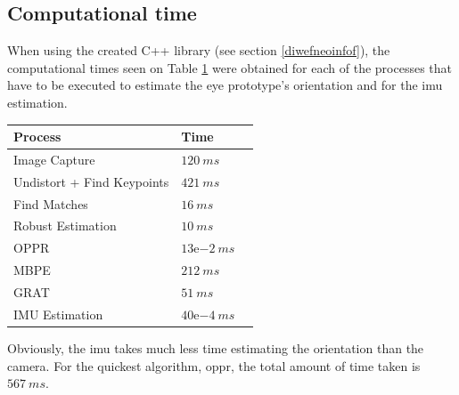 \subsection{Computational time}

When using the created C++ library (see section \ref{diwefneoinfof}), the computational times seen on Table \ref{cha5:sec1:speed} were obtained for each of the processes that have to be executed to estimate the eye prototype's orientation and for the \acrshort{imu} estimation.

\begin{table}[ht]
	\centering
	\begin{tabular}{| l | l | l |}
		\hline
		Process & Time \\
		\hline
		Image Capture & $120 \ ms$  \\
		\hline
		Undistort + Find Keypoints &   $421 \ ms$ \\
		\hline
		Find Matches & $16 \ ms$ \\ 
		\hline
		Robust Estimation & $10 \ ms$ \\ 
		\hline
		OPPR & $13\mathrm{e}{-2} \ ms$ \\ 
		\hline
		MBPE & $212 \ ms$ \\ 
		\hline
		GRAT & $51 \ ms$ \\ 
		\hline
		IMU Estimation &  $40\mathrm{e}{-4} \ ms$ \\ 
		\hline
	\end{tabular}
	\label{cha5:sec1:speed}
\end{table}

Obviously, the \acrshort{imu} takes much less time estimating the orientation than the camera. For the quickest algorithm, \acrshort{oppr}, the total amount of time taken is $567 \ ms$. 




